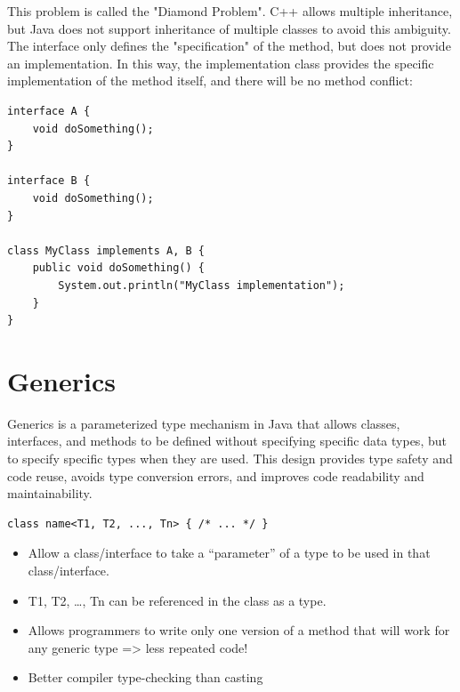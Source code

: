 \documentclass[letterpaper,12pt]{article}
\begin{document}
This problem is called the "Diamond Problem". C++ allows multiple inheritance, but Java does not support inheritance of multiple classes to avoid this ambiguity.\\
The interface only defines the "specification" of the method, but does not provide an implementation. In this way, the implementation class provides the specific implementation of the method itself, and there will be no method conflict:
\begin{verbatim}
interface A {
    void doSomething();
}

interface B {
    void doSomething();
}

class MyClass implements A, B {  
    public void doSomething() {  
        System.out.println("MyClass implementation");
    }
}
\end{verbatim}

\section{Generics}
Generics is a parameterized type mechanism in Java that allows classes, interfaces, and methods to be defined without specifying specific data types, but to specify specific types when they are used. This design provides type safety and code reuse, avoids type conversion errors, and improves code readability and maintainability.
\begin{verbatim}
class name<T1, T2, ..., Tn> { /* ... */ }
\end{verbatim}
\begin{itemize}
    \item Allow a class/interface to take a “parameter” of a type to be used in that class/interface.
    \item T1, T2, …, Tn can be referenced in the class as a type.
    \item Allows programmers to write only one version of a method that will work for any generic type => less repeated code!
    \item Better compiler type-checking than casting
\end{itemize}
\end{document}

